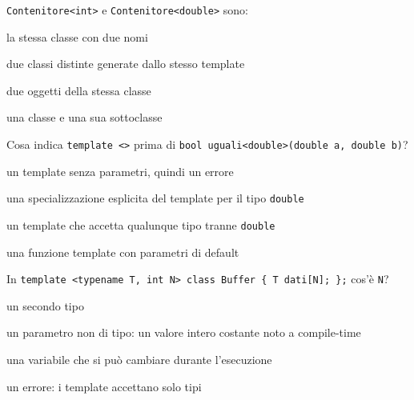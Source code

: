 \begin{quiz}{\texttt{Contenitore<int>} e \texttt{Contenitore<double>} sono:}
  \item la stessa classe con due nomi
  \item due classi distinte generate dallo stesso template
  \item due oggetti della stessa classe
  \item una classe e una sua sottoclasse
\end{quiz}

\begin{quiz}{Cosa indica \texttt{template <>} prima di \texttt{bool uguali<double>(double a, double b)}?}
  \item un template senza parametri, quindi un errore
  \item una specializzazione esplicita del template per il tipo \texttt{double}
  \item un template che accetta qualunque tipo tranne \texttt{double}
  \item una funzione template con parametri di default
\end{quiz}

\begin{quiz}{In \texttt{template <typename T, int N> class Buffer \{ T dati[N]; \};} cos'è \texttt{N}?}
  \item un secondo tipo
  \item un parametro non di tipo: un valore intero costante noto a compile-time
  \item una variabile che si può cambiare durante l'esecuzione
  \item un errore: i template accettano solo tipi
\end{quiz}

